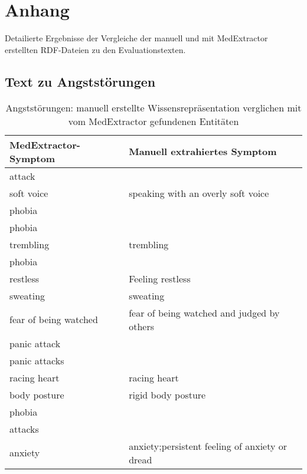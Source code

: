 %
%
\appendix
\chapter{Anhang}
\label{ch:Anhang}

Detailierte Ergebnisse der Vergleiche der manuell und mit MedExtractor erstellten RDF-Dateien zu den Evaluationstexten.

\section{Text zu Angststörungen}
\label{sec:anxietydisorders} 

\begin{table}[H]
\begin{center}
\begin{tabular}{ll}
\toprule
  MedExtractor-Symptom &                       Manuell extrahiertes Symptom \\
\midrule
               attack &                                                \\
           soft voice &             speaking with an overly soft voice \\
               phobia &                                                \\
               phobia &                                                \\
            trembling &                                      trembling \\
               phobia &                                                \\
             restless &                               Feeling restless \\
             sweating &                                       sweating \\
fear of being watched &     fear of being watched and judged by others \\
         panic attack &                                                \\
        panic attacks &                                                \\
         racing heart &                                   racing heart \\
         body posture &                             rigid body posture \\
               phobia &                                                \\
              attacks &                                                \\
              anxiety & anxiety;persistent feeling of anxiety or dread \\
\bottomrule
\end{tabular}
\caption{Angststörungen: manuell erstellte Wissensrepräsentation verglichen mit vom MedExtractor gefundenen Entitäten}
\label{tab:anxietydisorders_vergleich_manuell_medextractor}
\end{center}
\end{table}


